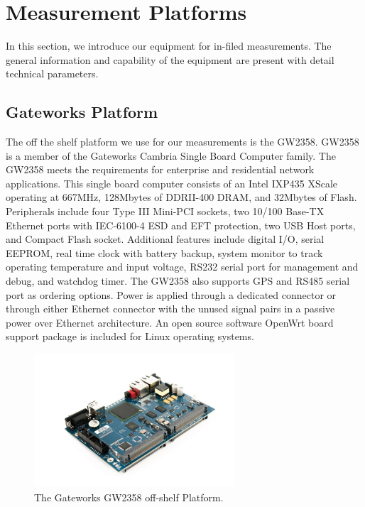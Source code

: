 \section{Measurement Platforms}


In this section, we introduce our equipment for in-filed measurements.
The general information and capability of the equipment are present 
with detail technical parameters.





\subsection{Gateworks Platform}

The off the shelf platform we use for our measurements is the GW2358. 
GW2358 is a member of the Gateworks Cambria Single Board Computer family. 
The GW2358 meets the requirements for enterprise and residential network 
applications. This single board computer consists of an Intel IXP435 XScale 
operating at 667MHz, 128Mbytes of DDRII-400 DRAM, and 32Mbytes of Flash. 
Peripherals include four Type III Mini-PCI sockets, two 10/100 Base-TX 
Ethernet ports with IEC-6100-4 ESD and EFT protection, two USB Host ports, 
and Compact Flash socket. Additional features include digital I/O, serial 
EEPROM, real time clock with battery backup, system monitor to track 
operating temperature and input voltage, RS232 serial port for management 
and debug, and watchdog timer. The GW2358 also supports GPS and RS485 
serial port as ordering options. Power is applied through a dedicated 
connector or through either Ethernet connector with the unused signal 
pairs in a passive power over Ethernet architecture. 
An open source software OpenWrt board support package is included 
for Linux operating systems.


\begin{figure} 
\centering
\includegraphics[width=75mm]{figures/gw2358}
\vspace{-0.1in}
\caption{The Gateworks GW2358 off-shelf Platform.}
\label{fig:gw2358}
\vspace{0.1in}
\end{figure}



